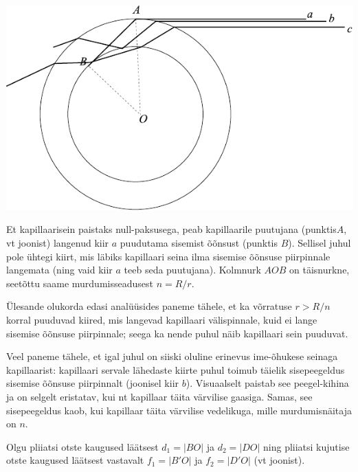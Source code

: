 \documentclass[10pt, twoside]{article}
\begin{document}
{%

\solu
\begin{center}
	\includegraphics[width=\linewidth]{2009-lahg-08-lah}
\end{center}

Et kapillaarisein paistaks null-paksusega, peab kapillaarile puutujana (punktis$A$, vt joonist) langenud kiir $a$ puudutama sisemist õõnsust (punktis $B$). Sellisel juhul pole ühtegi kiirt, mis läbiks kapillaari seina ilma sisemise õõnsuse piirpinnale langemata (ning vaid kiir $a$ teeb seda puutujana). Kolmnurk $AOB$ on täisnurkne, seetõttu saame murdumisseadusest $n= R/r$. 

Ülesande olukorda edasi analüüsides paneme tähele, et ka võrratuse $r> R/n$ korral puuduvad kiired, mis langevad kapillaari välispinnale, kuid ei lange sisemise õõnsuse piirpinnale; seega ka nende puhul näib kapillaari sein puuduvat. 

Veel paneme tähele, et igal juhul on siiski oluline erinevus ime-õhukese seinaga kapillaarist: kapillaari servale lähedaste kiirte puhul toimub täielik sisepeegeldus sisemise õõnsuse piirpinnalt (joonisel kiir $b$). Visuaalselt paistab see peegel-kihina ja on selgelt eristatav, kui nt kapillaar täita värvilise gaasiga. Samas, see sisepeegeldus kaob, kui kapillaar täita värvilise vedelikuga, mille murdumisnäitaja on $n$.
\probend
\bigskip


\solu
Olgu pliiatsi otste kaugused läätsest $d_1 = |BO|$ ja $d_2 = |DO|$ ning pliiatsi kujutise otste kaugused läätsest vastavalt $f_1 = |B'O|$ ja $f_2 = |D'O|$ (vt joonist).

}
\end{document}
